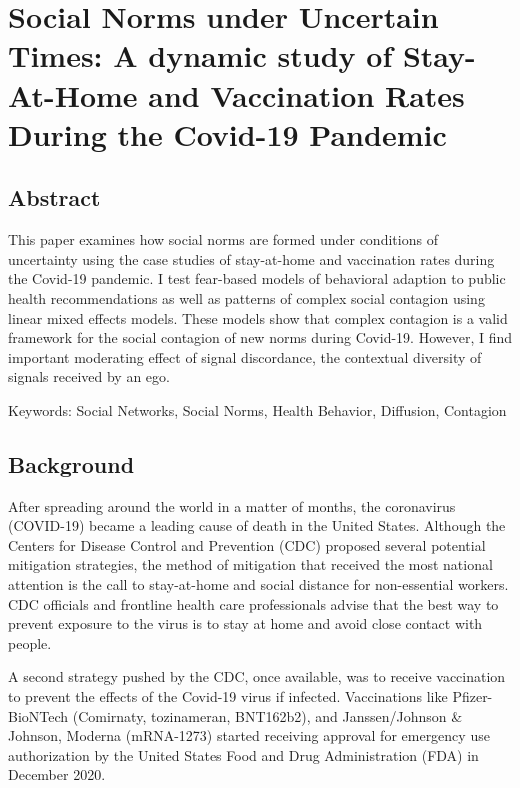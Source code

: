 \hypertarget{paper-3}{%
\chapter{Social Norms under Uncertain Times: A dynamic study of Stay-At-Home and Vaccination Rates During the Covid-19 Pandemic}\label{paper-3}}

\hypertarget{abstract-1}{%
\section{Abstract}\label{abstract-1}}

This paper examines how social norms are formed under conditions of uncertainty
using the case studies of stay-at-home and vaccination rates during the Covid-19
pandemic. I test fear-based models of behavioral adaption to public health
recommendations as well as patterns of complex social contagion using linear
mixed effects models. These models show that complex contagion is a valid
framework for the social contagion of new norms during Covid-19. However, I find
important moderating effect of signal discordance, the contextual diversity of
signals received by an ego.

Keywords: Social Networks, Social Norms, Health Behavior, Diffusion, Contagion

\citep{mirbabaie_etal20, ternullo22}

\hypertarget{background}{%
\section{Background}\label{background}}

After spreading around the world in a matter of months, the coronavirus
(COVID-19) became a leading cause of death in the United States. Although the
Centers for Disease Control and Prevention (CDC) \citeyearpar{centersfordiseasecontrolandpreventionHowProtectYourself2020} proposed several potential mitigation strategies, the method of mitigation that received the most national
attention is the call to stay-at-home and social distance for non-essential
workers. CDC officials and frontline health care professionals advise that the
best way to prevent exposure to the virus is to stay at home and avoid close
contact with people.

A second strategy pushed by the CDC, once available, was to receive vaccination
to prevent the effects of the Covid-19 virus if infected. Vaccinations like
Pfizer-BioNTech (Comirnaty, tozinameran, BNT162b2), and Janssen/Johnson \&
Johnson, Moderna (mRNA-1273) started receiving approval for emergency use
authorization by the United States Food and Drug Administration (FDA) in
December 2020.

